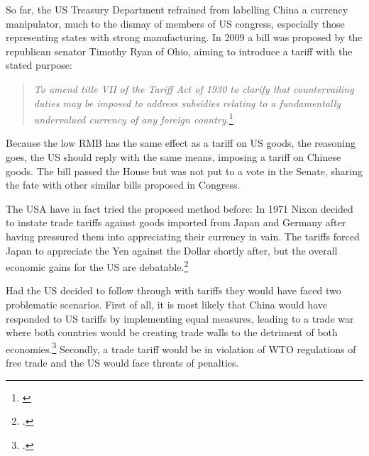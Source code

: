 
So far, the US Treasury Department refrained from labelling China a currency manipulator, much to the dismay of members of US congress, especially those representing states with strong manufacturing.
In 2009 a bill was proposed by the republican senator Timothy Ryan of 
Ohio, aiming to introduce a tariff with the stated purpose:
\begin{quotation}
\textit{To amend title VII of the Tariff Act of 1930 to clarify that 
countervailing duties may be imposed to address subsidies relating to a 
fundamentally undervalued currency of any foreign 
country.}\footnote{\cite{Ryan2009}}
\end{quotation}Because the low RMB has the same effect as a tariff on US 
goods, the reasoning goes, the US should reply with the same means, 
imposing a tariff on Chinese goods. The bill passed the House but was 
not put to a vote in the Senate, sharing the fate with other similar 
bills proposed in Congress. 

The USA have in fact tried the proposed method before: In 1971 Nixon decided to instate trade 
tariffs against goods imported from Japan and Germany after having 
pressured them into appreciating their currency in vain. The tariffs 
forced Japan to appreciate the Yen against the Dollar shortly after, but 
the overall economic gains for the US are debatable.\footnote{\cite{kuroda2004}.} 

Had the US decided to follow through with tariffs they would have faced 
two problematic scenarios. First of all, it is most likely that China 
would have responded to US tariffs by implementing equal measures, 
leading to a trade war where both countries would be creating trade 
walls to the detriment of both economies.\footnote{\cite{Levy2011}.} 
Secondly, a trade tariff would be in violation of WTO regulations of 
free trade and the US would face threats of penalties. 


